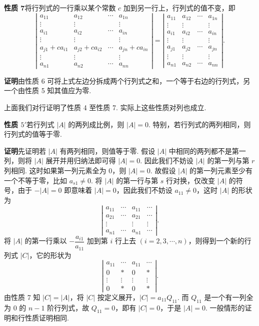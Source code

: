 \documentclass[UTF8, 12pt, fontset=fandol, oneside]{ctexart}
\begin{document}
\noindent\textbf{性质 7}\quad 将行列式的一行乘以某个常数 $c$ 加到另一行上，行列式的值不变，即
\[
\left|\begin{array}{cccc}
a_{11} & a_{12} & \cdots & a_{1n}\\
\vdots & \vdots & & \vdots\\
a_{i1} & a_{i2} & \cdots & a_{in}\\
\vdots & \vdots & & \vdots\\
a_{j1}+ca_{i1} & a_{j2}+ca_{i2} & \cdots & a_{jn}+ca_{in}\\
\vdots & \vdots & & \vdots\\
a_{n1} & a_{n2} & \cdots & a_{nn}
\end{array}\right|
=
\left|\begin{array}{cccc}
a_{11} & a_{12} & \cdots & a_{1n}\\
\vdots & \vdots & & \vdots\\
a_{i1} & a_{i2} & \cdots & a_{in}\\
\vdots & \vdots & & \vdots\\
a_{j1} & a_{j2} & \cdots & a_{jn}\\
\vdots & \vdots & & \vdots\\
a_{n1} & a_{n2} & \cdots & a_{nn}
\end{array}\right|.
\]

\noindent\textbf{证明}\quad 由性质 6 可将上式左边分拆成两个行列式之和，一个等于右边的行列式，另一个由性质 5 知其值应为零.

上面我们对行证明了性质 4 至性质 7. 实际上这些性质对列也成立.

\noindent\textbf{性质 $5'$}\quad 若行列式 $|A|$ 的两列成比例，则 $|A|=0$. 特别，若行列式的两列相同，则行列式的值等于零.

\noindent\textbf{证明}\quad 先证明若 $|A|$ 有两列相同，则值等于零. 假设 $|A|$ 中相同的两列都不是第一列，则将 $|A|$ 展开并用归纳法即可得 $|A|=0$. 因此我们不妨设 $|A|$ 的第一列与第 $r$ 列相同. 这时如果第一列元素全为 0，则 $|A|=0$. 故假设 $|A|$ 的第一列元素至少有一个不等于零，比如 $a_{s1}\ne0$. 将 $|A|$ 的第一行与第 $s$ 行对换，仅改变 $|A|$ 的符号，由于 $-|A|=0$ 即意味着 $|A|=0$，因此我们不妨设 $a_{11}\ne0$，这时 $|A|$ 的形状为
\[
\left|\begin{array}{ccccc}
a_{11} & \cdots & a_{11} & \cdots\\
a_{21} & \cdots & a_{21} & \cdots\\
\vdots & & \vdots & \vdots\\
a_{n1} & \cdots & a_{n1} & \cdots
\end{array}\right|.
\]
将 $|A|$ 的第一行乘以 $-\dfrac{a_{i1}}{a_{11}}$ 加到第 $i$ 行上去 $(i=2,3,\cdots,n)$，则得到一个新的行列式 $|C|$，它的形状为
\[
\left|\begin{array}{ccccc}
a_{11} & \cdots & a_{11} & \cdots\\
0 & * & 0 & *\\
\vdots & \vdots & \vdots & \vdots\\
0 & * & 0 & *
\end{array}\right|.
\]
由性质 7 知 $|C|=|A|$，将 $|C|$ 按定义展开，$|C|=a_{11}Q_{11}$. 而 $Q_{11}$ 是一个有一列全为 0 的 $n-1$ 阶行列式，故 $Q_{11}=0$，即有 $|C|=0$，于是 $|A|=0$. 一般情形的证明和行性质证明相同.
\end{document}
